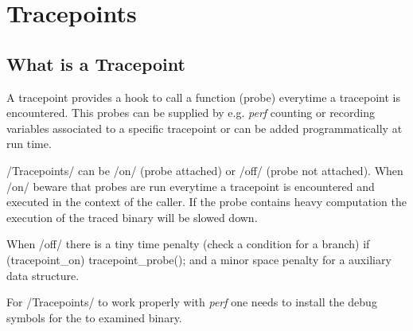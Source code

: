 \chapter{Tracepoints}
\section{What is a Tracepoint}
A tracepoint provides a hook to call a function (probe) everytime a
tracepoint is encountered. This probes can be supplied by e.g.  {\em perf}
counting or recording variables associated to a specific tracepoint or
can be added programmatically at run time.

/Tracepoints/ can be /on/ (probe attached) or /off/ (probe not
attached).  When /on/ beware that probes are run everytime a
tracepoint is encountered and executed in the context of the
caller. If the probe contains heavy computation the execution of the
traced binary will be slowed down.

When /off/ there is a tiny time penalty (check a condition for a branch)
\starttyping
if (tracepoint_on) { tracepoint_probe(); }
\stoptyping
and a minor space penalty for a auxiliary data structure.

For /Tracepoints/ to work properly with {\em perf} one needs to install the
debug symbols for the to examined binary.
